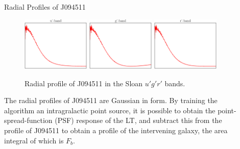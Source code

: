 \documentclass[final]{beamer}
\newlength{\sepwidth}
\newlength{\colwidth}
\newcommand{\separatorcolumn}{\begin{column}{\sepwidth}\end{column}}
\begin{document}
\begin{frame}[t]
\begin{columns}[t]
\begin{column}{\colwidth}
\begin{block}{\LARGE Radial Profiles of J094511}
\begin{figure}[h!]
    \includegraphics[width=0.32\textwidth]{J094511_U_annulus_flux.eps}
    \includegraphics[width=0.32\textwidth]{J094511_G_annulus_flux.eps}
    \includegraphics[width=0.32\textwidth]{J094511_R_annulus_flux.eps}
    \caption{\Large Radial profile of J094511 in the Sloan $u'g'r'$ bands.}
    \label{fig:radial_profiles}
\end{figure}

\Large The radial profiles of J094511 are Gaussian in form. By training the algorithm an intragralactic point source, it is possible to obtain the point-spread-function (PSF) response of the LT, and subtract this from the profile of J094511 to obtain a profile of the intervening galaxy, the area integral of which is $F_b$.
\end{block}

\end{column}
\separatorcolumn
\begin{column}{\colwidth}


\end{column}
\end{columns}
\end{frame}
\end{document}
